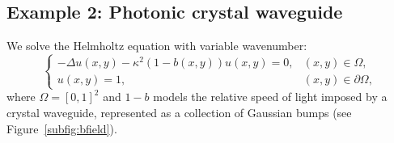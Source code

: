 \documentclass[final,onefignum,onetabnum]{siamart250211}
\theoremstyle{definition}
\begin{document}
\subsection{Example 2: Photonic crystal waveguide}\label{sub:example_2_photonic_crystal_waveguide}

We solve the Helmholtz equation with variable wavenumber:
\begin{equation}\label{eq:waveGuide}
\begin{cases}
    -\Delta u(x,y)-\kappa^2(1-b(x,y))u(x,y) = 0, & (x,y)\in\Omega,\\
    u(x,y)=1, & (x,y)\in\partial\Omega,
\end{cases}
\end{equation}
where $\Omega=[0,1]^2$ and $1-b$ models the relative speed of light imposed by a crystal waveguide, represented as a collection of Gaussian bumps (see Figure~\ref{subfig:bfield}).
\end{document}
